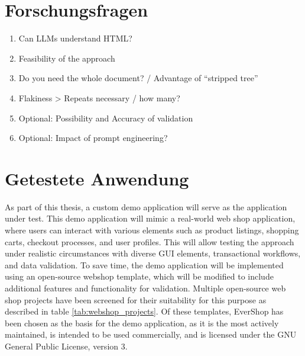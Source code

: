 \section{Forschungsfragen}

\begin{enumerate}
    \item Can LLMs understand HTML?
    \item Feasibility of the approach
    \item Do you need the whole document? / Advantage of “stripped tree”
    \item Flakiness > Repeats necessary / how many?
    \item Optional: Possibility and Accuracy of validation
    \item Optional: Impact of prompt engineering?
\end{enumerate}

\section{Getestete Anwendung}

As part of this thesis, a custom demo application will serve as the application under test.
This demo application will mimic a real-world web shop application, where users can interact with various elements such as product listings, shopping carts, checkout processes, and user profiles.
This will allow testing the approach under realistic circumstances with diverse GUI elements, transactional workflows, and data validation.
To save time, the demo application will be implemented using an open-source webshop template, which will be modified to include additional features and functionality for validation.
Multiple open-source web shop projects have been screened for their suitability for this purpose as described in table \ref{tab:webshop_projects}.
Of these templates, EverShop has been chosen as the basis for the demo application, as it is the most actively maintained, is intended to be used commercially, and is licensed under the GNU General Public License, version 3.

